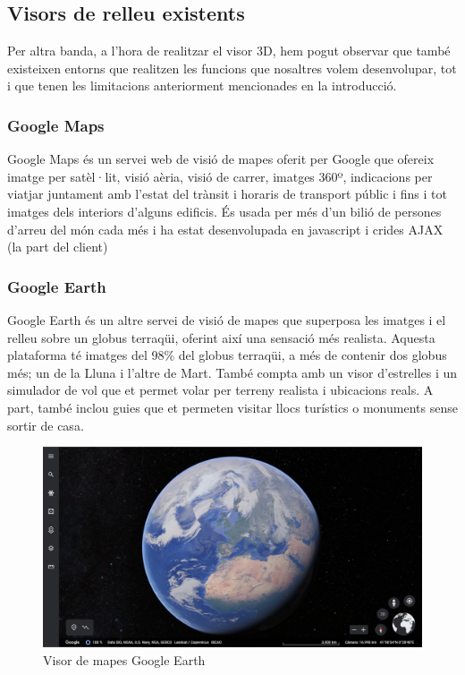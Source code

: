 ﻿\documentclass[10pt,a4paper,twocolumn,twoside]{article}
\begin{document}
\subsection{Visors de relleu existents}
Per altra banda, a l'hora de realitzar el visor 3D, hem pogut observar que també existeixen entorns que realitzen les funcions que nosaltres volem desenvolupar, tot i que tenen les limitacions anteriorment mencionades en la introducció.
\subsubsection{Google Maps}
Google Maps és un servei web de visió de mapes oferit per Google que ofereix imatge per satèl·lit, visió aèria, visió de carrer, imatges 360º, indicacions per viatjar juntament amb l'estat del trànsit i horaris de transport públic i fins i tot imatges dels interiors d'alguns edificis. És usada per més d'un bilió de persones d'arreu del món cada més i ha estat desenvolupada en javascript i crides AJAX (la part del client)
\subsubsection{Google Earth}
Google Earth és un altre servei de visió de mapes que superposa les imatges i el relleu sobre un globus terraqüi, oferint així una sensació més realista. Aquesta plataforma té imatges del 98\% del globus terraqüi, a més de contenir dos globus més; un de la Lluna i l'altre de Mart. També compta amb un visor d'estrelles i un simulador de vol que et permet volar per terreny realista i ubicacions reals. A part, també inclou guies que et permeten visitar llocs turístics o monuments sense sortir de casa.
\begin{figure}[h]
\centering
\includegraphics[width=.5\textwidth]{img/googleEarth.png}
\caption{Visor de mapes Google Earth}
\end{figure}

\end{document}
